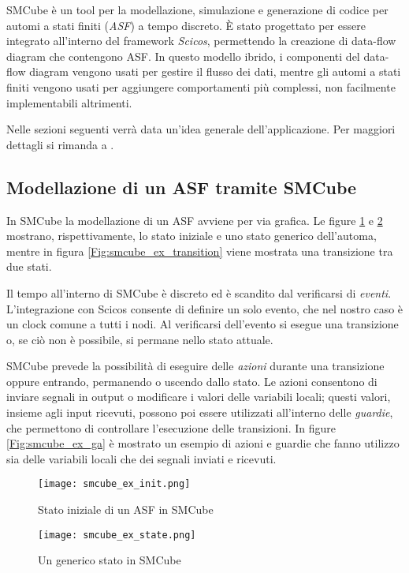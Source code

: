SMCube\cite{smcube} è un tool per la modellazione, simulazione e generazione di codice per automi a stati finiti (\textsl{ASF}) a tempo discreto. È stato progettato per essere integrato all'interno del framework \textit{Scicos}\cite{scicos}, permettendo la creazione di data-flow diagram che contengono ASF. In questo modello ibrido, i componenti del data-flow diagram vengono usati per gestire il flusso dei dati, mentre gli automi a stati finiti vengono usati per aggiungere comportamenti più complessi, non facilmente implementabili altrimenti.

Nelle sezioni seguenti verrà data un'idea generale dell'applicazione. Per maggiori dettagli si rimanda a \cite{smcube_man}.

\subsection{Modellazione di un ASF tramite SMCube}
In SMCube la modellazione di un ASF avviene per via grafica. Le figure \ref{Fig:smcube_ex_init} e \ref{Fig:smcube_ex_state} mostrano, rispettivamente, lo stato iniziale e uno stato generico dell'automa, mentre in figura \ref{Fig:smcube_ex_transition} viene mostrata una transizione tra due stati.

Il tempo all'interno di SMCube è discreto ed è scandito dal verificarsi di \textsl{eventi}. L'integrazione con Scicos consente di definire un solo evento, che nel nostro caso è un clock comune a tutti i nodi. Al verificarsi dell'evento si esegue una transizione o, se ciò non è possibile, si permane nello stato attuale.

SMCube prevede la possibilità di eseguire delle \textsl{azioni} durante una transizione oppure entrando, permanendo o uscendo dallo stato. Le azioni consentono di inviare segnali in output o modificare i valori delle variabili locali; questi valori, insieme agli input ricevuti, possono poi essere utilizzati all'interno delle \textsl{guardie}, che permettono di controllare l'esecuzione delle transizioni. In figure \ref{Fig:smcube_ex_ga} è mostrato un esempio di azioni e guardie che fanno utilizzo sia delle variabili locali che dei segnali inviati e ricevuti.

\begin{figure}
\centering
\texttt{[image: smcube\_ex\_init.png]}
\caption{Stato iniziale di un ASF in SMCube}
\label{Fig:smcube_ex_init}
\end{figure}

\begin{figure}
\centering
\texttt{[image: smcube\_ex\_state.png]}
\caption{Un generico stato in SMCube}
\label{Fig:smcube_ex_state}
\end{figure}

